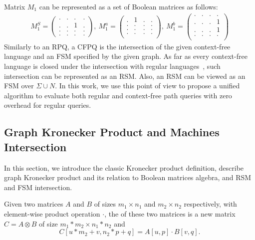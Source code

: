 Matrix $M_1$ can be represented as a set of Boolean matrices as follows:
{\small
\begin{align*}
M_1^S =
\begin{pmatrix}
    . & . & . & .   \\
    . & . & 1 & .   \\
    . & . & . & .   \\
    . & . & . & .
\end{pmatrix},~M_1^a =
\begin{pmatrix}
   . & 1 & . & .   \\
   . & . & . & .   \\
   . & . & . & .   \\
   . & . & . & .   \\
\end{pmatrix},~M_1^b =
\begin{pmatrix}
    . & . & . & .   \\
    . & . & . & 1   \\
    . & . & . & 1   \\
    . & . & . & .   \\
\end{pmatrix}
\end{align*}
}
Similarly to an RPQ, a CFPQ is the intersection of the given context-free language and an FSM specified by the given graph.
As far as every context-free language is closed under the intersection with regular languages~\cite{automata:theory:10.5555/1177300}, such intersection can be represented as an RSM.
Also, an RSM can be viewed as an FSM over $\Sigma \cup N$.
In this work, we use this point of view to propose a unified algorithm to evaluate both regular and context-free path queries with zero overhead for regular queries.

\subsection{Graph Kronecker Product and Machines Intersection}

In this section, we introduce the classic Kronecker product definition,
describe graph Kronecker product and its relation to Boolean matrices algebra,
and RSM and FSM intersection.

\begin{definition}
Given two matrices $A$ and $B$ of sizes $m_1 \times n_1$ and $m_2 \times n_2$
respectively, with element-wise product operation $\cdot$, the  of these two matrices is a new matrix $C = A \otimes B$ of size $m_1 * m_2 \times n_1 * n_2$ and \[C[u * m_2 + v,n_2 * p + q] = A[u,p] \cdot B[v,q].\]
\end{definition}

